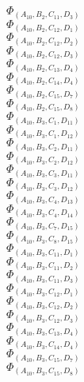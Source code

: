 \documentclass[14pt]{article}
\begin{document}
    $\Phi_{({A}_{10}, {B}_{2}, {C}_{11}, {D}_{3})}$ \\ 
    $\Phi_{({A}_{10}, {B}_{2}, {C}_{12}, {D}_{1})}$ \\ 
    $\Phi_{({A}_{10}, {B}_{2}, {C}_{12}, {D}_{2})}$ \\ 
    $\Phi_{({A}_{10}, {B}_{2}, {C}_{12}, {D}_{3})}$ \\ 
    $\Phi_{({A}_{10}, {B}_{2}, {C}_{13}, {D}_{4})}$ \\ 
    $\Phi_{({A}_{10}, {B}_{2}, {C}_{14}, {D}_{4})}$ \\ 
    $\Phi_{({A}_{10}, {B}_{2}, {C}_{15}, {D}_{7})}$ \\ 
    $\Phi_{({A}_{10}, {B}_{2}, {C}_{15}, {D}_{8})}$ \\ 
    $\Phi_{({A}_{10}, {B}_{3}, {C}_{1}, {D}_{11})}$ \\ 
    $\Phi_{({A}_{10}, {B}_{3}, {C}_{1}, {D}_{12})}$ \\ 
    $\Phi_{({A}_{10}, {B}_{3}, {C}_{2}, {D}_{11})}$ \\ 
    $\Phi_{({A}_{10}, {B}_{3}, {C}_{2}, {D}_{12})}$ \\ 
    $\Phi_{({A}_{10}, {B}_{3}, {C}_{3}, {D}_{11})}$ \\ 
    $\Phi_{({A}_{10}, {B}_{3}, {C}_{3}, {D}_{12})}$ \\ 
    $\Phi_{({A}_{10}, {B}_{3}, {C}_{4}, {D}_{13})}$ \\ 
    $\Phi_{({A}_{10}, {B}_{3}, {C}_{4}, {D}_{14})}$ \\ 
    $\Phi_{({A}_{10}, {B}_{3}, {C}_{7}, {D}_{15})}$ \\ 
    $\Phi_{({A}_{10}, {B}_{3}, {C}_{8}, {D}_{15})}$ \\ 
    $\Phi_{({A}_{10}, {B}_{3}, {C}_{11}, {D}_{1})}$ \\ 
    $\Phi_{({A}_{10}, {B}_{3}, {C}_{11}, {D}_{2})}$ \\ 
    $\Phi_{({A}_{10}, {B}_{3}, {C}_{11}, {D}_{3})}$ \\ 
    $\Phi_{({A}_{10}, {B}_{3}, {C}_{12}, {D}_{1})}$ \\ 
    $\Phi_{({A}_{10}, {B}_{3}, {C}_{12}, {D}_{2})}$ \\ 
    $\Phi_{({A}_{10}, {B}_{3}, {C}_{12}, {D}_{3})}$ \\ 
    $\Phi_{({A}_{10}, {B}_{3}, {C}_{13}, {D}_{4})}$ \\ 
    $\Phi_{({A}_{10}, {B}_{3}, {C}_{14}, {D}_{4})}$ \\ 
    $\Phi_{({A}_{10}, {B}_{3}, {C}_{15}, {D}_{7})}$ \\ 
    $\Phi_{({A}_{10}, {B}_{3}, {C}_{15}, {D}_{8})}$ \\ 
\end{document}
